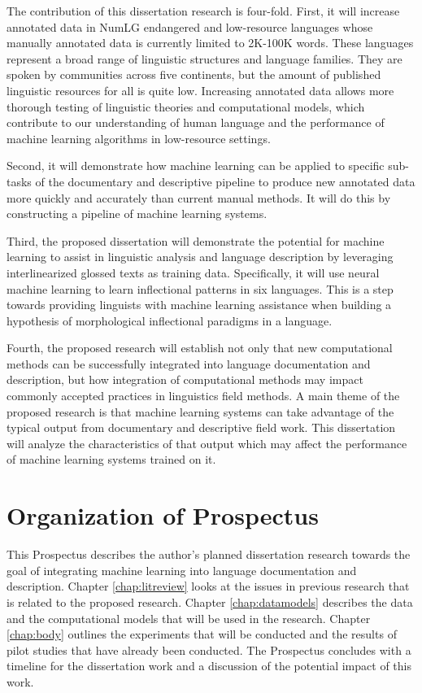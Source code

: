 The contribution of this dissertation research is four-fold. First, it will increase annotated data in NumLG endangered and low-resource languages whose manually annotated data is currently limited to 2K-100K words.  These languages represent a broad range of linguistic structures and language families. They are spoken by communities across five continents, but the amount of published linguistic resources for all is quite low. Increasing annotated data allows more thorough testing of linguistic theories and computational models, which contribute to our understanding of human language and the performance of machine learning algorithms in low-resource settings. 

Second, it will demonstrate how machine learning can be applied to specific sub-tasks of the documentary and descriptive pipeline to produce new annotated data more quickly and accurately than current manual methods. It will do this by constructing a pipeline of machine learning systems.

Third, the proposed dissertation will demonstrate the potential for machine learning to assist in linguistic analysis and language description by leveraging interlinearized glossed texts as training data. Specifically, it will use neural machine learning to learn inflectional patterns in six languages. This is a step towards providing linguists with machine learning assistance when building a hypothesis of morphological inflectional paradigms in a language.

Fourth, the proposed research will establish not only that new computational methods can be successfully integrated into language documentation and description, but how integration of computational methods may impact commonly accepted practices in linguistics field methods. A main theme of the proposed research is that machine learning systems can take advantage of the typical output from documentary and descriptive field work. This dissertation will analyze the characteristics of that output which may affect the performance of machine learning systems trained on it. 

\section{Organization of Prospectus}

This Prospectus describes the author's planned dissertation research towards the goal of integrating machine learning into language documentation and description. Chapter \ref{chap:litreview} looks at the issues in previous research that is related to the proposed research. Chapter \ref{chap:datamodels} describes the data and the computational models that will be used in the research. Chapter \ref{chap:body} outlines the experiments that will be conducted and the results of pilot studies that have already been conducted. The Prospectus concludes with a timeline for the dissertation work and a discussion of the potential impact of this work.

